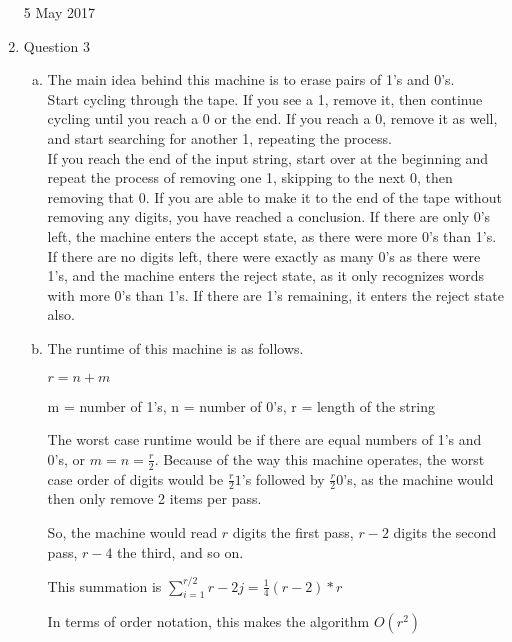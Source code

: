 \documentclass[11pt]{article}
\begin{document}
\begin{enumerate}
			5 May 2017 \\

		\item Question 3

			\begin{enumerate}[(a)]

				\item The main idea behind this machine is to erase pairs of 1's and 0's. \\

					Start cycling through the tape. If you see a 1, remove it, then continue cycling until you reach a
					0 or the end. If you reach a 0, remove it as well, and start searching for another 1, repeating the process. \\

					If you reach the end of the input string, start over at the beginning and repeat the process of removing one 1, skipping
					to the next 0, then removing that 0. If you are able to make it to the end of the tape without removing any digits, you have
					reached a conclusion. If there are only 0's left, the machine enters the accept state, as there were more 0's than 1's. If there
					are no digits left, there were exactly as many 0's as there were 1's, and the machine enters the reject state, as it only recognizes
					words with more 0's than 1's. If there are 1's remaining, it enters the reject state also. \\

				\item The runtime of this machine is as follows.

					$r = n + m$

					m = number of 1's, n = number of 0's, r = length of the string

					The worst case runtime would be if there are equal numbers of 1's and 0's, or $m=n=\frac{r}{2}$. Because of the way this machine
					operates, the worst case order of digits would be $\frac{r}{2} 1$'s followed by $\frac{r}{2} 0$'s, as the machine would then only
					remove 2 items per pass.

					So, the machine would read $r$ digits the first pass, $r-2$ digits the second pass, $r-4$ the third, and so on.

					This summation is $\sum_{i=1}^{r/2}{r-2j} = \frac{1}{4} (r-2)*r$

					In terms of order notation, this makes the algorithm $O(r^2)$ \\

			\end{enumerate}


\end{enumerate}
\end{document}
